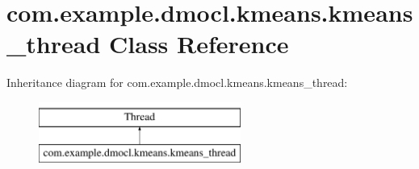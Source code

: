 \hypertarget{classcom_1_1example_1_1dmocl_1_1kmeans_1_1kmeans__thread}{}\section{com.\+example.\+dmocl.\+kmeans.\+kmeans\+\_\+thread Class Reference}
\label{classcom_1_1example_1_1dmocl_1_1kmeans_1_1kmeans__thread}
Inheritance diagram for com.\+example.\+dmocl.\+kmeans.\+kmeans\+\_\+thread\+:\begin{figure}[H]
\begin{center}
\leavevmode
\includegraphics[height=2.000000cm]{classcom_1_1example_1_1dmocl_1_1kmeans_1_1kmeans__thread}
\end{center}
\end{figure}
